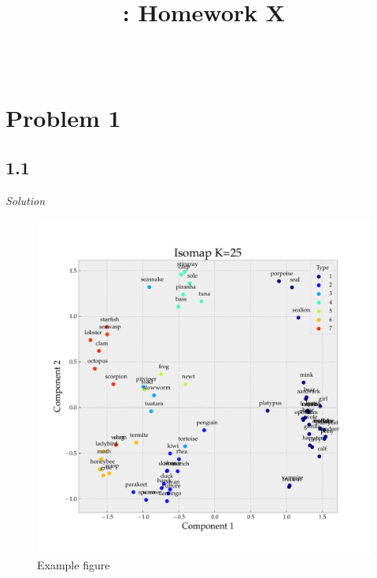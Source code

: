 \documentclass[fleqn,12pt]{olplainarticle}
\title{\courseid : Homework X}
\author[1]{\fullname \ \idnumber}
\begin{document}
\flushbottom
\maketitle
\thispagestyle{empty}

\section*{Problem 1}
\subsection*{1.1}
\textit{Solution}
\begin{figure}[!h]
    \centering
        \includegraphics[width=12cm]{exampleFigure.pdf}
    \caption{Example figure}
    \label{exampleFigure}
\end{figure}
\end{document}
